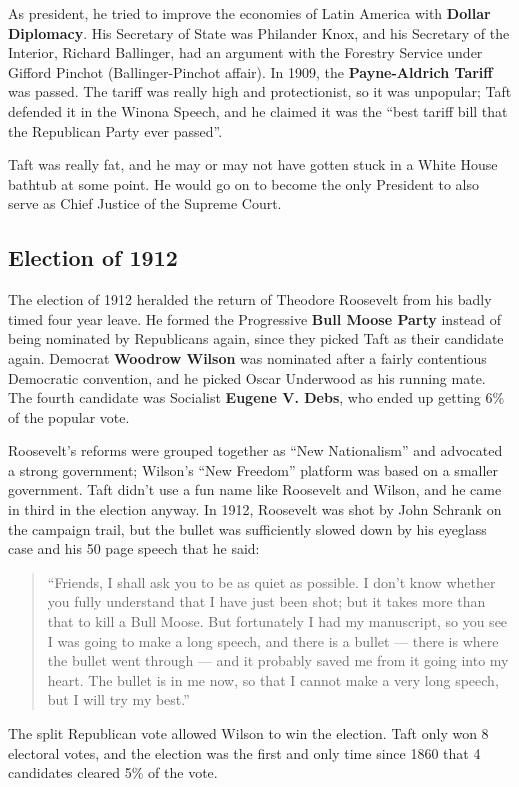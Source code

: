 As president, he tried to improve the economies of Latin America with \textbf{Dollar Diplomacy}.
His Secretary of State was Philander Knox,
and his Secretary of the Interior, Richard Ballinger,
had an argument with the Forestry Service under Gifford Pinchot (Ballinger-Pinchot affair).
In 1909, the \textbf{Payne-Aldrich Tariff} was passed.
The tariff was really high and protectionist, so it was unpopular;
Taft defended it in the Winona Speech,
and he claimed it was the ``best tariff bill that the Republican Party ever passed''.

Taft was really fat, and he may or may not have gotten stuck in a White House bathtub at some point.
He would go on to become the only President to also serve as Chief Justice of the Supreme Court.

\subsection*{Election of 1912}

The election of 1912 heralded the return of Theodore Roosevelt from his badly timed four year leave.
He formed the Progressive \textbf{Bull Moose Party} instead of being nominated by Republicans again,
since they picked Taft as their candidate again.
Democrat \textbf{Woodrow Wilson} was nominated after a fairly contentious Democratic convention,
and he picked Oscar Underwood as his running mate.
The fourth candidate was Socialist \textbf{Eugene V. Debs}, who ended up getting 6\% of the popular vote.

Roosevelt's reforms were grouped together as ``New Nationalism'' and advocated a strong government;
Wilson's ``New Freedom'' platform was based on a smaller government.
Taft didn't use a fun name like Roosevelt and Wilson, and he came in third in the election anyway.
In 1912, Roosevelt was shot by John Schrank on the campaign trail,
but the bullet was sufficiently slowed down by his eyeglass case and his 50 page speech that he said:

\begin{quotation}
  ``Friends, I shall ask you to be as quiet as possible.
  I don't know whether you fully understand that I have just been shot;
  but it takes more than that to kill a Bull Moose.
  But fortunately I had my manuscript, so you see I was going to make a long speech, and there is a bullet ---
  there is where the bullet went through --- and it probably saved me from it going into my heart.
  The bullet is in me now, so that I cannot make a very long speech, but I will try my best.''
\end{quotation}

The split Republican vote allowed Wilson to win the election.
Taft only won 8 electoral votes,
and the election was the first and only time since 1860 that 4 candidates cleared 5\% of the vote.

